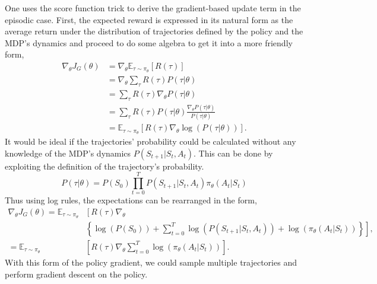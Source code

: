 One uses the score function trick to derive the gradient-based update term in the episodic case. First, the expected reward is expressed in its natural form as the average return under the distribution of trajectories defined by the policy and the MDP's dynamics and proceed to do some algebra to get it into a more friendly form,
\begin{align}
	\nabla_\theta J_G(\theta) & = \nabla_\theta \mathbb{E}_{\tau \sim \pi_\theta}\left[R(\tau)\right]                            \\
	                          & = \nabla_\theta \sum_\tau R(\tau) P(\tau|\theta)                                                 \\
	                          & = \sum_\tau R(\tau) \nabla_\theta P(\tau | \theta)                                               \\
	                          & = \sum_\tau R(\tau) P(\tau | \theta) \frac{\nabla_\theta P(\tau | \theta)}{P(\tau |\theta)}      \\
	                          & = \mathbb{E}_{\tau \sim \pi_{\theta}} \left[ R(\tau) \nabla_\theta \log(P(\tau| \theta))\right].
\end{align}
It would be ideal if the trajectories' probability could be calculated without any knowledge of the MDP's dynamics $P(S_{t+1}| S_t, A_t)$. This can be done by exploiting the definition of the trajectory's probability.
\begin{equation}
	P(\tau|\theta) = P(S_0) \prod_{t=0}^ TP(S_{t+1}| S_t, A_t)\pi_\theta(A_{t}|S_{t})
\end{equation}
Thus using log rules, the expectations can be rearranged in the form,
\begin{align}
	\nabla_\theta J_G(\theta)  = \mathbb{E}_{\tau \sim \pi_{\theta}} & \left[ R(\tau) \nabla_\theta  \right.                                                                               \\
	                                                                 & \left. \left\{ \log(P(S_0)) +  \sum_{t=0}^ T \log(P(S_{t+1}| S_t, A_t))+ \log(\pi_\theta(A_t|S_t))\right\} \right], \\
	= \mathbb{E}_{\tau \sim \pi_{\theta}}                            & \left[ R(\tau) \nabla_\theta \sum_{t=0}^ T \log(\pi_\theta(A_t|S_t))\right].
\end{align}
With this form of the policy gradient, we could sample multiple trajectories and perform gradient descent on the policy. 

